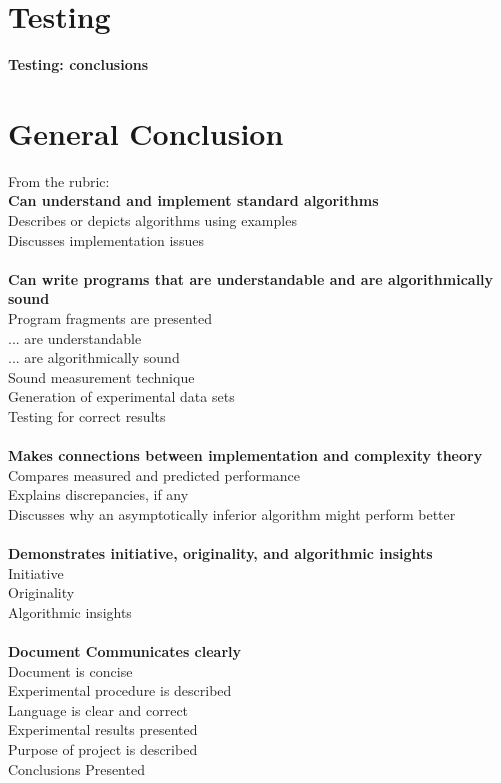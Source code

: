 \documentclass{IEEEtran}
\begin{document}
\section{Testing}\label{sec:testing}

\textbf{Testing: conclusions}

\section{General Conclusion}

\noindent
From the rubric:\\
\textbf{Can understand and implement standard algorithms}\\
Describes or depicts algorithms using examples\\
Discusses implementation issues\\
\\
\textbf{Can write programs that are understandable and are algorithmically sound}\\
Program fragments are presented\\
... are understandable\\
... are algorithmically sound\\
Sound measurement technique\\
Generation of experimental data sets\\
Testing for correct results\\
\\
\textbf{Makes connections between implementation and complexity theory}\\
Compares measured and predicted performance\\
Explains discrepancies, if any\\
Discusses why an asymptotically inferior algorithm might perform better\\
\\
\textbf{Demonstrates initiative, originality, and algorithmic insights}\\
Initiative\\
Originality\\
Algorithmic insights\\
\\
\textbf{Document Communicates clearly}\\
Document is concise \\
Experimental procedure is described \\
Language is clear and correct \\
Experimental results presented \\
Purpose of project is described \\
Conclusions Presented \\

\pagebreak


\end{document}
